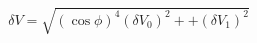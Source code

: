 \begin{equation}
\label{eq:delta_V_Malus}
\delta V = \sqrt{ \left(\cos{\phi}\right)^4(\delta V_0)^2 + + (\delta V_1)^2}
\end{equation}